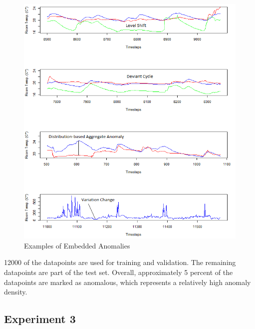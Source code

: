 \begin{figure}[h]
	\centering
	\includegraphics[scale=0.7]{Figures/temp_anomalies}
	\decoRule
	\caption[Temperature Dataset Anomalies]{Examples of Embedded Anomalies \parencite{Own}}
	\label{fig:temp_anomalies}
\end{figure}

12000 of the datapoints are used for training and validation. The remaining datapoints are part of the test set. Overall, approximately 5 percent of the datapoints are marked as anomalous, which represents a relatively high anomaly density.


\subsection{Experiment 3}
